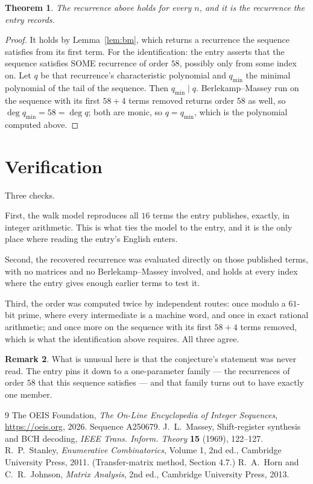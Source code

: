 \documentclass[11pt,a4paper]{article}
\theoremstyle{plain}
\newtheorem{theorem}{Theorem}
\theoremstyle{definition}
\newtheorem{remark}[theorem]{Remark}
\begin{document}
\begin{theorem}
The recurrence above holds for every $n$, and it is the recurrence the entry records.
\end{theorem}

\begin{proof}
It holds by Lemma~\ref{lem:bm}, which returns a recurrence the sequence satisfies from its
first term. For the identification: the entry asserts that the sequence satisfies SOME
recurrence of order $58$, possibly only from some index on. Let $q$ be that recurrence's
characteristic polynomial and $q_{\min}$ the minimal polynomial of the tail of the sequence.
Then $q_{\min}\mid q$. Berlekamp--Massey run on the sequence with its first $58+4$ terms
removed returns order $58$ as well, so $\deg q_{\min}=58=\deg q$; both are monic, so
$q=q_{\min}$, which is the polynomial computed above.
\end{proof}

\section{Verification}

Three checks.

First, the walk model reproduces all $16$ terms the entry publishes, exactly, in integer
arithmetic. This is what ties the model to the entry, and it is the only place where reading
the entry's English enters.

Second, the recovered recurrence was evaluated directly on those published terms, with no
matrices and no Berlekamp--Massey involved, and holds at every index where the entry gives
enough earlier terms to test it.

Third, the order was computed twice by independent routes: once modulo a $61$-bit prime, where
every intermediate is a machine word, and once in exact rational arithmetic; and once more on
the sequence with its first $58+4$ terms removed, which is what the identification above
requires. All three agree.

\begin{remark}
What is unusual here is that the conjecture's statement was never read. The entry pins it down
to a one-parameter family --- the recurrences of order $58$ that this sequence satisfies
--- and that family turns out to have exactly one member.
\end{remark}

\begin{thebibliography}{9}
 The OEIS Foundation, \emph{The On-Line Encyclopedia of Integer
Sequences}, \url{https://oeis.org}, 2026. Sequence A250679.
 J.~L.~Massey, Shift-register synthesis and BCH decoding, \emph{IEEE
Trans. Inform. Theory} \textbf{15} (1969), 122--127.
 R.~P.~Stanley, \emph{Enumerative Combinatorics}, Volume 1, 2nd ed.,
Cambridge University Press, 2011. (Transfer-matrix method, Section 4.7.)
 R.~A.~Horn and C.~R.~Johnson, \emph{Matrix Analysis}, 2nd ed., Cambridge
University Press, 2013.
\end{thebibliography}
\end{document}
